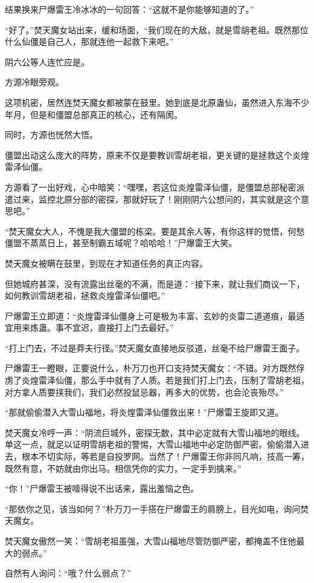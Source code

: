 \begin{this_body}
结果换来尸爆雷王冷冰冰的一句回答：“这就不是你能够知道的了。”

“好了。”焚天魔女站出来，缓和场面，“我们现在的大敌，就是雪胡老祖。既然那位什么仙僵是自己人，那就连他一起救下来吧。”

阴六公等人连忙应是。

方源冷眼旁观。

这项机密，居然连焚天魔女都被蒙在鼓里。她到底是北原蛊仙，虽然进入东海不少年月，但是和僵盟总部真正的核心，还有隔阂。

同时，方源也恍然大悟。

僵盟出动这么庞大的阵势，原来不仅是要教训雪胡老祖，更关键的是拯救这个炎煌雷泽仙僵。

方源看了一出好戏，心中暗笑：“嘿嘿，若这位炎煌雷泽仙僵，是僵盟总部秘密派遣过来，监控北原分部的密探，那就好玩了！刚刚阴六公想问的，其实就是这个意思吧。”

“焚天魔女大人，不愧是我大僵盟的栋梁。要是其余人等，有你这样的觉悟，何愁僵盟不蒸蒸日上，甚至制霸五域呢？哈哈哈！”尸爆雷王大笑。

焚天魔女被瞒在鼓里，到现在才知道任务的真正内容。

但她城府甚深，没有流露出丝毫的不满，而是道：“接下来，就让我们商议一下，如何教训雪胡老祖，拯救炎煌雷泽仙僵吧。”

尸爆雷王立即道：“炎煌雷泽仙僵身上可是极为丰富、玄妙的炎雷二道道痕，最适宜用来炼蛊。事不宜迟，直接打上门去最好。”

“打上门去，不过是莽夫行径。”焚天魔女直接地反驳道，丝毫不给尸爆雷王面子。

尸爆雷王一瞪眼，正要说什么，朴万刀也开口支持焚天魔女：“不错。对方既然俘虏了炎煌雷泽仙僵，那么手中就有了人质。若是我们打上门去，压制了雪胡老祖，对方拿人质要挟我们，我们必然投鼠忌器，再多大的优势，也会沦丧殆尽。”

“那就偷偷潜入大雪山福地，将炎煌雷泽仙僵救出来！”尸爆雷王旋即又道。

焚天魔女冷哼一声：“阴流巨城外，密探无数，其中必定就有大雪山福地的眼线。单这一点，就足以证明雪胡老祖的警惕，大雪山福地中必定防御严密。偷偷潜入进去，根本不切实际，等若是自投罗网。当然了！尸爆雷王你非同凡响，技高一筹，既然有意，不妨就由你出马。相信凭你的实力，一定手到擒来。”

“你！”尸爆雷王被噎得说不出话来，露出羞恼之色。

“那依你之见，该当如何？”朴万刀一手搭在尸爆雷王的肩膀上，目光如电，询问焚天魔女。

焚天魔女傲然一笑：“雪胡老祖虽强，大雪山福地尽管防御严密，都掩盖不住他最大的弱点。”

自然有人询问：“哦？什么弱点？”


\end{this_body}
